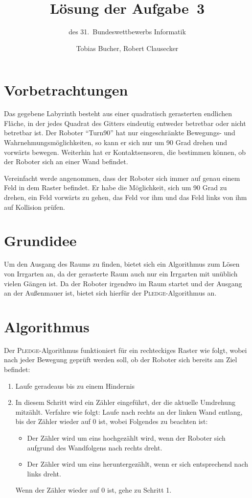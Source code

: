 \documentclass{scrartcl}
\title{Lösung der Aufgabe~3}
\subtitle{des 31.~Bundeswettbewerbs Informatik}
\author{Tobias Bucher, Robert Clausecker}
\begin{document}
\maketitle

\section{Vorbetrachtungen}
Das gegebene Labyrinth besteht aus einer quadratisch gerasterten endlichen
Fläche, in der jedes Quadrat des Gitters eindeutig entweder betretbar oder
nicht betretbar ist. Der Roboter "`Turn90"' hat nur eingeschränkte Bewegungs-
und Wahrnehmungsmöglichkeiten, so kann er sich nur um 90 Grad drehen und
vorwärts bewegen. Weiterhin hat er Kontaktsensoren, die bestimmen können, ob
der Roboter sich an einer Wand befindet.

Vereinfacht werde angenommen, dass der Roboter sich immer auf genau einem Feld
in dem Raster befindet. Er habe die Möglichkeit, sich um 90 Grad zu drehen, ein
Feld vorwärts zu gehen, das Feld vor ihm und das Feld links von ihm auf
Kollision prüfen.

\section{Grundidee}
Um den Ausgang des Raums zu finden, bietet sich ein Algorithmus zum Lösen von
Irrgarten an, da der gerasterte Raum auch nur ein Irrgarten mit unüblich vielen
Gängen ist. Da der Roboter irgendwo im Raum startet und der Ausgang an der
Außenmauer ist, bietet sich hierfür der \textsc{Pledge}-Algorithmus an.

\section{Algorithmus}
Der \textsc{Pledge}-Algorithmus funktioniert für ein rechteckiges Raster wie
folgt, wobei nach jeder Bewegung geprüft werden soll, ob der Roboter sich
bereits am Ziel befindet:

\begin{enumerate}
\item Laufe geradeaus bis zu einem Hindernis
\item In diesem Schritt wird ein Zähler eingeführt, der die aktuelle Umdrehung
mitzählt. Verfahre wie folgt: Laufe nach rechts an der linken Wand entlang, bis
der Zähler wieder auf $0$ ist, wobei Folgendes zu beachten ist:
	\begin{itemize}
	\item Der Zähler wird um eins hochgezählt wird, wenn der Roboter sich aufgrund des Wandfolgens nach rechts dreht.
	\item Der Zähler wird um eins heruntergezählt, wenn er sich entsprechend nach links dreht.
	\end{itemize}
Wenn der Zähler wieder auf $0$ ist, gehe zu Schritt 1.
\end{enumerate}
\end{document}
